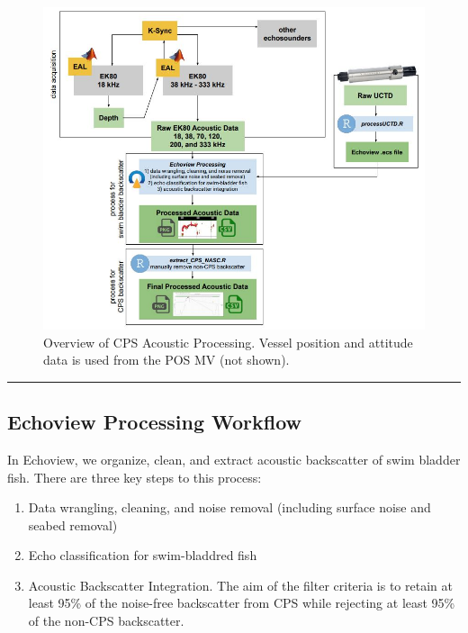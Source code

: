 \documentclass[
  letterpaper,
  oneside,
  open=any]{scrbook}
\begin{document}
\begin{figure}[H]

{\centering \includegraphics{content/images/processing-overview.JPG}

}

\caption{Overview of CPS Acoustic Processing. Vessel position and
attitude data is used from the POS MV (not shown).}

\end{figure}%

\begin{center}\rule{0.5\linewidth}{0.5pt}\end{center}

\subsection{Echoview Processing
Workflow}\label{echoview-processing-workflow}

In Echoview, we organize, clean, and extract acoustic backscatter of
swim bladder fish. There are three key steps to this process:

\begin{enumerate}
\def\labelenumi{\arabic{enumi}.}
\item
  Data wrangling, cleaning, and noise removal (including surface noise
  and seabed removal)
\item
  Echo classification for swim-bladdred fish
\item
  Acoustic Backscatter Integration. The aim of the filter criteria is to
  retain at least 95\% of the noise-free backscatter from CPS while
  rejecting at least 95\% of the non-CPS backscatter.
\end{enumerate}
\end{document}
